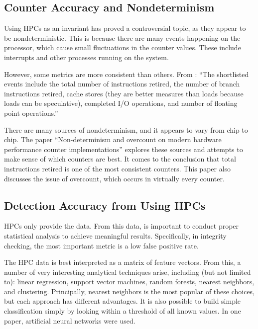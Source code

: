 \documentclass[notitlepage]{article}
\begin{document}
\subsection{Counter Accuracy and Nondeterminism}
Using HPCs as an invariant has proved a controversial topic, as they appear to
be nondeterministic. This is because there are many events happening on the
processor, which cause small fluctuations in the counter values. These include
interrupts and other processes running on the system.

However, some metrics are more consistent than others. From \cite{arehardware}:
``The shortlisted events include the total number of instructions retired, the
number of branch instructions retired, cache stores (they are better measures
than loads because loads can be speculative), completed I/O operations, and
number of floating point operations.''\cite{arehardware}

There are many sources of nondeterminism, and it appears to vary from chip to
chip. The paper ``Non-determinism and overcount on modern hardware performance
counter implementations'' explores these sources and attempts to make sense of
which counters are best. It comes to the conclusion that total instructions
retired is one of the most consistent counters\cite{overcount}. This paper also
discusses the issue of overcount, which occurs in virtually every counter.

\subsection{Detection Accuracy from Using HPCs}
HPCs only provide the data. From this data, is important to conduct proper
statistical analysis to achieve meaningful results. Specifically, in integrity
checking, the most important metric is a low false positive rate.

The HPC data is best interpreted as a matrix of feature vectors.  From this, a
number of very interesting analytical techniques arise, including (but not
limited to): linear regression, support vector machines, random forests, nearest
neighbors, and clustering. Principally, nearest neighbors is the most popular of
these choices, but each approach has different advantages\cite{forsyth}. It is
also possible to build simple classification simply by looking within a
threshold of all known values\cite{numchecker}. In one paper, artificial neural
networks were used\cite{feasibility}.
\end{document}
